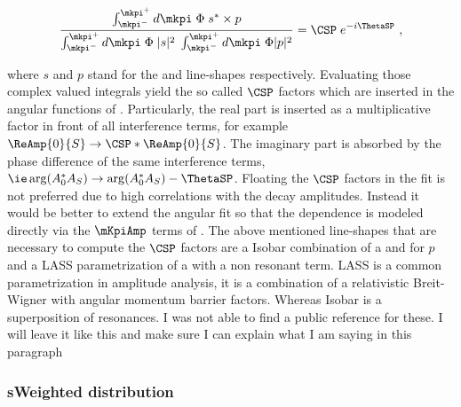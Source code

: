 \begin{equation}
  \centering
  \label{csp_def}
  \frac{\int_{\mkpi^-}^{\mkpi^+} d\mkpi \; \Phi \; s^* \times p} {\int_{\mkpi^-}^{\mkpi^+} d\mkpi \; \Phi \; |s|^2 \; \int_{\mkpi^-}^{\mkpi^+} d\mkpi \; \Phi |p|^2} = \CSP \; e^{-i\ThetaSP} \ ,
\end{equation}

\noindent where $s$ and $p$ stand for the \swave and \pwave line-shapes respectively. Evaluating those complex valued integrals yield
the so called $\CSP$ factors which are inserted in the angular functions of . Particularly, the real part is inserted
as a multiplicative factor in front of all \spwave interference terms, for example $\ReAmp{0}{S} \rightarrow \CSP * \ReAmp{0}{S}$.
The imaginary part is absorbed by the phase difference of the same interference
terms, $\ie \arg(A_0^*A_S) \rightarrow \arg(A_0^*A_S) - \ThetaSP$. Floating the $\CSP$ factors in the fit is not preferred due
to high correlations with the decay amplitudes. Instead it would be better to extend the angular fit so that the \mkpi dependence
is modeled directly via the $\mKpiAmp$ terms of . The above mentioned \swave line-shapes that are necessary
to compute the $\CSP$ factors are a Isobar combination of a \KstENT and \KstOFOZ for $p$ and a LASS parametrization of a \KstOFTZ
with a non resonant term. LASS is a common \swave parametrization in amplitude analysis, it is a combination of a relativistic Breit-Wigner
with angular momentum barrier factors. Whereas Isobar is a superposition of resonances. {\color{red}I was not able to find a public reference for these. I
 will leave it like this and make sure I can explain what I am saying in this paragraph }


\subsubsection{sWeighted \mkpi distribution}

